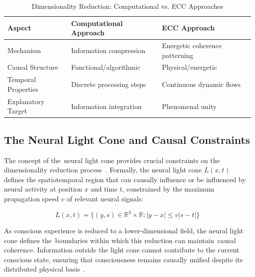 \begin{table}[h]
    \centering
    \caption{Dimensionality Reduction: Computational vs. ECC Approaches}
    \begin{tabular}{|p{3cm}|p{4cm}|p{4cm}|}
        \hline
        \textbf{Aspect}     & \textbf{Computational Approach} & \textbf{ECC Approach}          \\
        \hline
        Mechanism           & Information compression         & Energetic coherence patterning \\
        \hline
        Causal Structure    & Functional/algorithmic          & Physical/energetic             \\
        \hline
        Temporal Properties & Discrete processing steps       & Continuous dynamic flows       \\
        \hline
        Explanatory Target  & Information integration         & Phenomenal unity               \\
        \hline
    \end{tabular}
\end{table}

\subsection*{The Neural Light Cone and Causal Constraints}

The concept of the~neural light cone provides crucial constraints on the dimensionality reduction process~\cite{da2024mathematical,bosl2025dynamical}. Formally, the neural light cone $L(x,t)$ defines the spatiotemporal region that can causally influence or be influenced by neural activity at position $x$ and time $t$, constrained by the maximum propagation speed $v$ of relevant neural signals:

\begin{equation}
    L(x,t) = \{(y,s) \in \mathbb{R}^3 \times \mathbb{R} : |y-x| \leq v|s-t|\}
\end{equation}

As conscious experience is reduced to a lower-dimensional field, the neural light cone defines the~boundaries within which this reduction can maintain~causal coherence. Information outside the light cone cannot contribute to the current conscious state, ensuring that consciousness remains causally unified despite its distributed physical basis~\cite{hunt2024electromagnetic,McFadden2020}.

